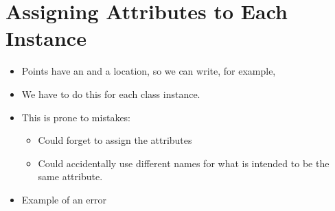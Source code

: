 \documentclass[letterpaper,10pt,english]{sphinxmanual}
\begin{document}
\section{Assigning Attributes to Each Instance}
\label{\detokenize{lecture_notes/lec18_classes1:assigning-attributes-to-each-instance}}\begin{itemize}
\item {} 
Points have an  and a  location, so we can write, for
example,

%
\begin{sphinxVerbatim}[commandchars=\\\{\}]
   
  
  
  
    
\end{sphinxVerbatim}

\item {} 
We have to do this for each class instance.

\item {} 
This is prone to mistakes:
\begin{itemize}
\item {} 
Could forget to assign the attributes

\item {} 
Could accidentally use different names for what is intended to be
the same attribute.

\end{itemize}

\item {} 
Example of an error

%
\begin{sphinxVerbatim}[commandchars=\\\{\}]
  
  
        
\end{sphinxVerbatim}

\end{itemize}
\end{document}
